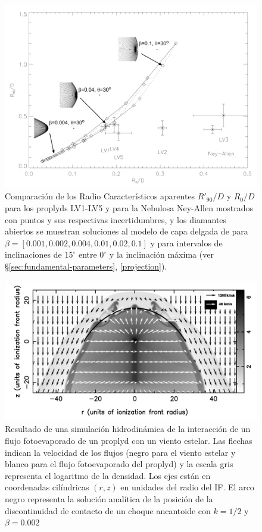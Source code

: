 \begin{figure}
  \includegraphics[width=0.7\linewidth]{./Figures/robberto}
  \caption{Comparación de los Radio Característicos aparentes $R'_{90}/D$ y $R_0/D$ para los proplyds LV1-LV5 y para la Nebulosa Ney-Allen mostrados con puntos y sus respectivas incertidumbres, y los diamantes abiertos se muestran soluciones al modelo de capa delgada de \citep{Canto:1996} para $\beta=[0.001, 0.002, 0.004, 0.01, 0.02, 0.1]$ y para intervalos de inclinaciones de $15^\circ$ entre $0^\circ$ y la inclinación máxima (ver \S \ref{sec:fundamental-parameters}, \ref{projection}).}
  \label{fig:Robberto}
\end{figure}

\begin{figure}
  \includegraphics[width=0.7\linewidth]{./Figures/GA-simulation}
  \caption{Resultado de una simulación hidrodinámica de la interacción de un flujo fotoevaporado de un proplyd con un viento estelar. Las flechas indican la velocidad de los flujos (negro para el viento estelar y blanco para el flujo fotoevaporado del proplyd) y la escala gris representa el logaritmo de la densidad. Los ejes están en coordenadas cilíndricas $(r, z)$ en unidades del radio del IF. El arco negro representa la solución analítica de la posición de la discontinuidad de contacto de un choque ancantoide con $k=1/2$ y $\beta=0.002$ \citep{Garcia-Arredondo:2001}}
  \label{fig:simulation}
\end{figure}


